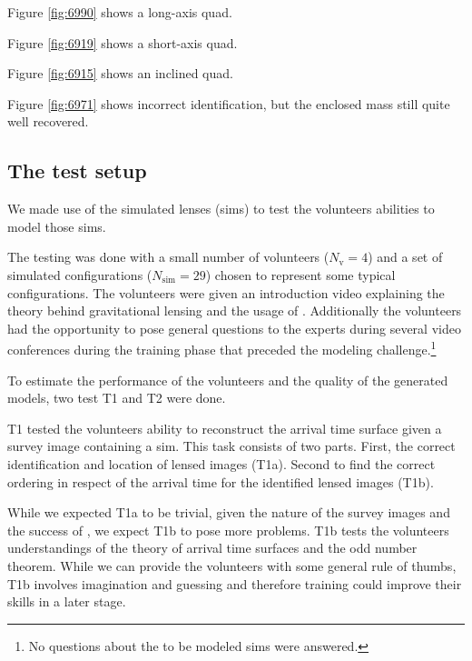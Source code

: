 Figure \ref{fig:6990} shows a long-axis quad.

Figure \ref{fig:6919} shows a short-axis quad.

Figure \ref{fig:6915} shows an inclined quad.

Figure \ref{fig:6971} shows incorrect identification, but the enclosed
mass still quite well recovered.


\subsection{The test setup} \label{sec:testsetup}

We made use of the simulated lenses (sims) to test the volunteers abilities to model those sims.

The testing was done with a small number of volunteers ($N_\text{v}=4$) and a set of simulated configurations ($N_\text{sim}=29$) chosen to represent some typical configurations.
The volunteers were given an introduction video explaining the theory behind gravitational lensing and the usage of \spl.
Additionally the volunteers had the opportunity to pose general questions to the experts during several video conferences during the training phase that preceded the modeling challenge.\footnote{No questions about the to be modeled sims were answered.}

To estimate the performance of the volunteers and the quality of the generated models, two test T1 and T2 were done.

T1 tested the volunteers ability to reconstruct the arrival time surface given a survey image containing a sim.
This task consists of two parts.
First, the correct identification and location of lensed images (T1a).
Second to find the correct ordering in respect of the arrival time for the identified lensed images (T1b).

While we expected T1a to be trivial, given the nature of the survey images and the success of \sw, we expect T1b to pose more problems.
T1b tests the volunteers understandings of the theory of arrival time surfaces and the odd number theorem.
While we can provide the volunteers with some general rule of thumbs, T1b involves imagination and guessing and therefore training could improve their skills in a later stage.

